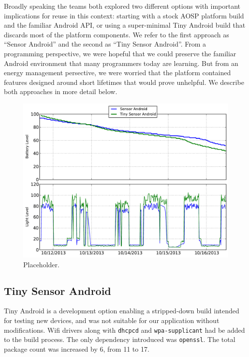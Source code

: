 Broadly speaking the teams both explored two different options with important
implications for reuse in this context: starting with a stock AOSP platform
build and the familiar Android API, or using a super-minimal Tiny Android
build that discards most of the platform components. We refer to the first
approach as ``Sensor Android'' and the second as ``Tiny Sensor Android''.
From a programming perspective, we were hopeful that we could preserve the
familiar Android environment that many programmers today are learning. But
from an energy management persective, we were worried that the platform
contained features designed around short lifetimes that would prove
unhelpful. We describe both approaches in more detail below.

\begin{figure}[t]
\includegraphics[width=\columnwidth]{./figures/comparison.pdf}

\caption{\small Placeholder.}

\label{fig-tinyvfull}
\end{figure}

\subsection{Tiny Sensor Android}
\label{subsec-tiny}

Tiny Android is a development option enabling a stripped-down build intended
for testing new devices, and was not suitable for our application without
modifications. Wifi drivers along with \texttt{dhcpcd} and
\texttt{wpa-supplicant} had be added to the build process. The only
dependency introduced was \texttt{openssl}. The total package count was
increased by 6, from 11 to 17.

